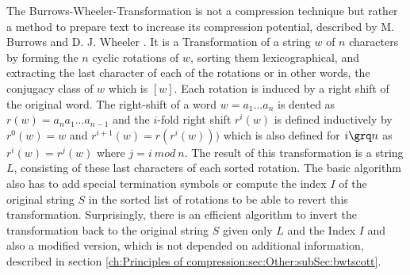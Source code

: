 \par{
The Burrows-Wheeler-Transformation is not a compression technique but rather a method to prepare text to increase its compression potential, described by M. Burrows and D. J. Wheeler \cite{Burrows94}. It is a Transformation of a string $w$ of $n$ characters by forming the $n$ cyclic rotations of $w$, sorting them lexicographical, and extracting the last character of each of the rotations or in other words, the conjugacy class of $w$ which is $[w]$. Each rotation is induced by a right shift of the original word. The right-shift of a word $w=a_1 ... a_n$ is dented as $r(w) = a_na_1...a_{n-1}$ and the $i$-fold right shift $r^i(w)$ is defined inductively by $r^0(w) = w$ and $r^{i+1}(w) = r(r^i(w))) $ which is also defined for $i \grq n$ as $r^i(w)=r^j(w)$ where $j = i \: mod \: n$. The result of this transformation is a string $L$, consisting of these last characters of each sorted rotation. The basic algorithm also has to add special termination symbols or compute the index $I$ of the original string $S$ in the sorted list of rotations to be able to revert this transformation. Surprisingly, there is an efficient algorithm to invert the transformation back to the original string $S$ given only $L$ and the Index $I$ \cite{Burrows-linear-time} and also a modified version, which is not depended on additional information, described in section \ref{ch:Principles of compression:sec:Other:subSec:bwtscott}.
}

